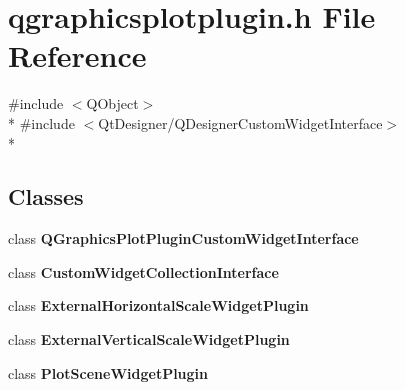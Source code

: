 \section{qgraphicsplotplugin.\+h File Reference}
\label{plugins_2qgraphicsplotplugin_8h}
{\ttfamily \#include $<$Q\+Object$>$}\\*
{\ttfamily \#include $<$Qt\+Designer/\+Q\+Designer\+Custom\+Widget\+Interface$>$}\\*
\subsection*{Classes}
\begin{DoxyCompactItemize}
\item 
class {\bf Q\+Graphics\+Plot\+Plugin\+Custom\+Widget\+Interface}
\item 
class {\bf Custom\+Widget\+Collection\+Interface}
\item 
class {\bf External\+Horizontal\+Scale\+Widget\+Plugin}
\item 
class {\bf External\+Vertical\+Scale\+Widget\+Plugin}
\item 
class {\bf Plot\+Scene\+Widget\+Plugin}
\end{DoxyCompactItemize}
